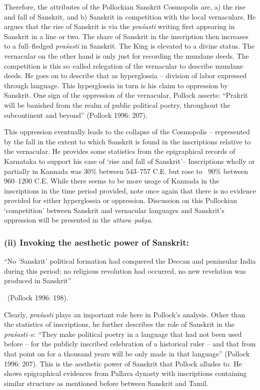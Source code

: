 Therefore, the attributes of the Pollockian Sanskrit Cosmopolis are, a) the rise and fall of Sanskrit, and b) Sanskrit in competition with the local vernaculars. He argues that the rise of Sanskrit is via the \textit{praśasti} writing first appearing in Sanskrit in a line or two. The share of Sanskrit in the inscription then increases to a full–fledged \textit{praśasti} in Sanskrit. The King is elevated to a divine status. The vernacular on the other hand is only just for recording the mundane deeds. The competition is this so–called relegation of the vernacular to describe mundane deeds. He goes on to describe that as hyperglossia – division of labor expressed through language. This hyperglossia in turn is his claim to oppression by Sanskrit. One sign of the oppression of the vernacular, Pollock asserts: “Prakrit will be banished from the realm of public political poetry, throughout the subcontinent and beyond” (Pollock 1996: 207).

This oppression eventually leads to the collapse of the Cosmopolis – represented by the fall in the extent to which Sanskrit is found in the inscriptions relative to the vernacular. He provides some statistics from the epigraphical records of Karnataka to support his case of ‘rise and fall of Sanskrit’– Inscriptions wholly or partially in Kannada was 30\% between 543–757 C.E. but rose to ~90\% between 960–1200 C.E. While there seems to be more usage of Kannada in the inscriptions in the time period provided, note once again that there is no evidence provided for either hyperglossia or oppression. Discussion on this Pollockian ‘competition’ between Sanskrit and vernacular languages and Sanskrit’s oppression will be presented in the \textit{uttara–pakṣa}.


\subsubsection*{(ii) Invoking the aesthetic power of Sanskrit:}

\begin{myquote}
“No ‘Sanskrit’ political formation had conquered the Deccan and peninsular India during this period; no religious revolution had occurred, no new revelation was produced in Sanskrit” 

~\hfill (Pollock 1996: 198).
\end{myquote}

Clearly, \textit{praśasti} plays an important role here in Pollock’s analysis. Other than the statistics of inscriptions, he further describes the role of Sanskrit in the \textit{praśasti}–s: “They make political poetry in a language that had not been used before – for the publicly inscribed celebration of a historical ruler – and that from that point on for a thousand years will be only made in that language” (Pollock 1996: 207). This is the aesthetic power of Sanskrit that Pollock alludes to. He shows epigraphical evidences from Pallava dynasty with inscriptions containing similar structure as mentioned before between Sanskrit and Tamil.

